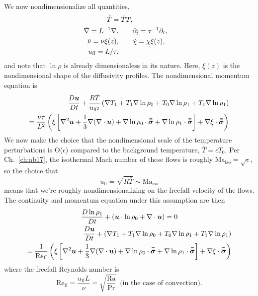 We now nondimensionalize all quantities, 
\begin{equation}
\begin{split}
\td{T} =  \bar{T} T, \\
\td{\grad} = L^{-1}\grad,  		\qquad &\partial_{\td{t}} = \tau^{-1}\partial_t, \\
\td{\nu} = \nu\xi(z),				\qquad &\td{\chi} = \chi\xi(z),\\
u_{\ff} = L/\tau, \qquad &%
\end{split}
\end{equation}
and note that $\ln\rho$ is already dimensionaless in its nature.
Here, $\xi(z)$ is the nondimensional shape of the diffusivity profiles.
The nondimensional momentum equation is
\begin{equation}
\begin{split}
\frac{D \bm{u}}{Dt} + \frac{ R \bar{T}}{u_{\text{ff}^2}} \left( \nabla T_1 + T_1 \nabla \ln\rho_0 + T_0 \nabla \ln\rho_1 + T_1 \nabla\ln\rho_1\right)
\\
= \frac{\nu \tau}{L^2}\left( \xi\left[\nabla^2\bm{u} + \frac{1}{3}\nabla(\nabla\cdot\bm{u}) + \nabla\ln\rho_0\cdot\bm{\bar{\bar{\sigma}}} + \nabla\ln\rho_1\cdot\bm{\bar{\bar{\sigma}}}\right] + \nabla\xi\cdot\bm{\bar{\bar{\sigma}}}\right)
\end{split}
\end{equation}
We now make the choice that the nondimensional scale of the temperature perturbations is O($\epsilon$) compared to the background temperature, $\bar{T} = \epsilon T_0$.
Per Ch.~\ref{ch:ab17}, the isothermal Mach number of these flows is roughly $\text{Ma}_{\text{iso}} = \sqrt{\epsilon}$, so the choice that
$$
u_{\text{ff}}= \sqrt{R \bar{T}} \sim \text{Ma}_{\text{iso}} 
$$
means that we're roughly nondimensionalizing on the freefall velocity of the flows.
The continuity and momentum equation under this assumption are then
\begin{gather}
\frac{D \ln\rho_1}{Dt} + (\bm{u}\cdot\ln\rho_0 + \nabla\cdot\bm{u}) = 0 \\
\begin{split}
\frac{D \bm{u}}{Dt} + \left( \nabla T_1 + T_1 \nabla \ln\rho_0 + T_0 \nabla \ln\rho_1 + T_1 \nabla\ln\rho_1\right)
\\
= \frac{1}{\text{Re}_{\text{ff}}}\left( \xi\left[\nabla^2\bm{u} + \frac{1}{3}\nabla(\nabla\cdot\bm{u}) + \nabla\ln\rho_0\cdot\bm{\bar{\bar{\sigma}}} + \nabla\ln\rho_1\cdot\bm{\bar{\bar{\sigma}}}\right] + \nabla\xi\cdot\bm{\bar{\bar{\sigma}}}\right)
\end{split}
\end{gather}
where the freefall Reynolds number is
$$
\text{Re}_{\text{ff}} = \frac{u_{\text{ff}} L}{\nu} = \sqrt{\frac{\text{Ra}}{\text{Pr}}}\,\,\,\text{(in the case of convection)}.
$$
